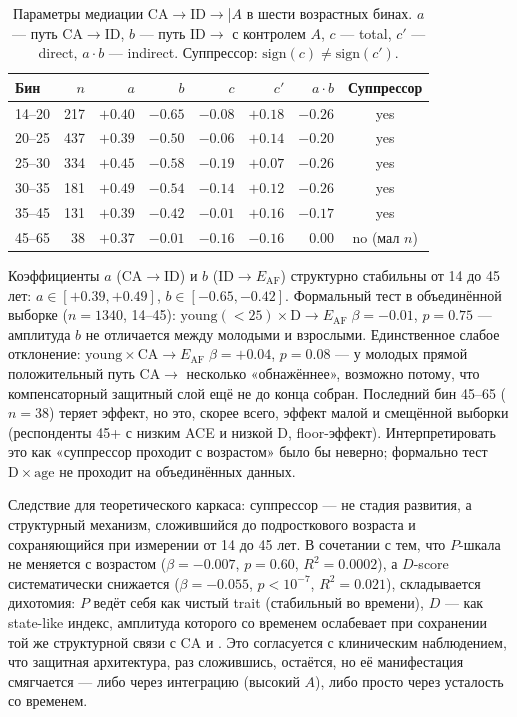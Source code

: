 \begin{table}[htbp]
\centering
\small
\caption[Параметры суппрессора по возрастным бинам]{Параметры медиации CA$\to$ID$\to$\EAF{}|$A$ в шести возрастных бинах. $a$ --- путь CA$\to$ID, $b$ --- путь ID$\to$\EAF{} с контролем $A$, $c$ --- total, $c'$ --- direct, $a \cdot b$ --- indirect. Суппрессор: $\mathrm{sign}(c) \neq \mathrm{sign}(c')$.}
\label{tab:age_bins_suppressor}
\begin{tabular}{lrrrrrrc}
\hline
Бин & $n$ & $a$ & $b$ & $c$ & $c'$ & $a\cdot b$ & Суппрессор \\
\hline
14--20 & 217 & $+0.40$ & $-0.65$ & $-0.08$ & $+0.18$ & $-0.26$ & yes \\
20--25 & 437 & $+0.39$ & $-0.50$ & $-0.06$ & $+0.14$ & $-0.20$ & yes \\
25--30 & 334 & $+0.45$ & $-0.58$ & $-0.19$ & $+0.07$ & $-0.26$ & yes \\
30--35 & 181 & $+0.49$ & $-0.54$ & $-0.14$ & $+0.12$ & $-0.26$ & yes \\
35--45 & 131 & $+0.39$ & $-0.42$ & $-0.01$ & $+0.16$ & $-0.17$ & yes \\
45--65 & 38 & $+0.37$ & $-0.01$ & $-0.16$ & $-0.16$ & $0.00$ & no (мал $n$) \\
\hline
\end{tabular}
\end{table}

Коэффициенты $a$ ($\mathrm{CA}\to\mathrm{ID}$) и $b$ ($\mathrm{ID}\to E_{\mathrm{AF}}$) структурно стабильны от 14 до 45 лет: $a \in [+0.39, +0.49]$, $b \in [-0.65, -0.42]$. Формальный тест в объединённой выборке ($n = 1340$, 14--45): $\mathrm{young}(<25) \times \mathrm{D} \to E_{\mathrm{AF}} \; \beta = -0.01$, $p = 0.75$ --- амплитуда $b$ не отличается между молодыми и взрослыми. Единственное слабое отклонение: $\mathrm{young} \times \mathrm{CA} \to E_{\mathrm{AF}} \; \beta = +0.04$, $p = 0.08$ --- у молодых прямой положительный путь CA$\to$\EAF{} несколько «обнажённее», возможно потому, что компенсаторный защитный слой ещё не до конца собран. Последний бин 45--65 ($n = 38$) теряет эффект, но это, скорее всего, эффект малой и смещённой выборки (респонденты 45+ с низким ACE и низкой D, floor-эффект). Интерпретировать это как «суппрессор проходит с возрастом» было бы неверно; формально тест $\mathrm{D}\times\mathrm{age}$ не проходит на объединённых данных.

Следствие для теоретического каркаса: суппрессор --- не стадия развития, а структурный механизм, сложившийся до подросткового возраста и сохраняющийся при измерении от 14 до 45 лет. В сочетании с тем, что $P$-шкала не меняется с возрастом ($\beta = -0.007$, $p = 0.60$, $R^2 = 0.0002$), а $D$-score систематически снижается ($\beta = -0.055$, $p < 10^{-7}$, $R^2 = 0.021$), складывается дихотомия: $P$ ведёт себя как чистый trait (стабильный во времени), $D$ --- как state-like индекс, амплитуда которого со временем ослабевает при сохранении той же структурной связи с CA и \EAF{}. Это согласуется с клиническим наблюдением, что защитная архитектура, раз сложившись, остаётся, но её манифестация смягчается --- либо через интеграцию (высокий $A$), либо просто через усталость со временем.

